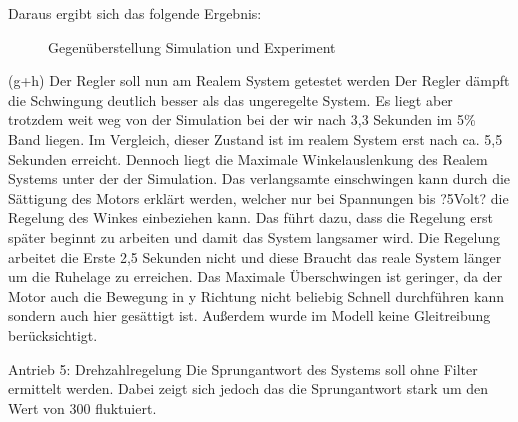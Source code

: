 \documentclass[10pt]{scrartcl}
\begin{document}
Daraus ergibt sich das folgende Ergebnis: 
\begin{figure} 
\caption{ Gegenüberstellung Simulation und Experiment} 
\end{figure}
(g+h) Der Regler soll nun am Realem System getestet werden
Der Regler dämpft die Schwingung deutlich besser als das ungeregelte System. Es liegt aber trotzdem weit weg von der Simulation bei der wir nach 3,3 Sekunden im 5\% Band liegen. Im Vergleich, dieser Zustand ist im realem System erst nach ca. 5,5 Sekunden erreicht. Dennoch liegt die Maximale Winkelauslenkung des Realem Systems unter der der Simulation. Das verlangsamte einschwingen kann durch die Sättigung des Motors erklärt werden, welcher nur bei Spannungen bis ?5Volt? die Regelung des Winkes einbeziehen kann. Das führt dazu, dass die Regelung erst später beginnt zu arbeiten und damit das System langsamer wird. Die Regelung arbeitet die Erste 2,5 Sekunden nicht und diese Braucht das reale System länger um die Ruhelage zu erreichen. Das Maximale Überschwingen ist geringer, da der Motor auch die Bewegung in y Richtung nicht beliebig Schnell durchführen kann sondern auch hier gesättigt ist. Außerdem wurde im Modell keine Gleitreibung berücksichtigt.

Antrieb 
5: Drehzahlregelung
	Die Sprungantwort des Systems soll ohne Filter ermittelt werden. Dabei zeigt sich jedoch das die Sprungantwort stark um den Wert von 300 fluktuiert.
 
\end{document}
